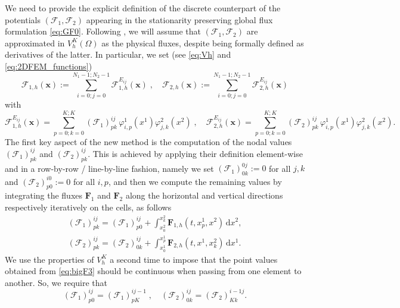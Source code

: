 \documentclass[a4paper,10pt]{article}
\begin{document}
We need to provide the explicit definition of the discrete counterpart of the potentials $(\mathcal{F}_1,\mathcal{F}_2)$ appearing in the 
stationarity preserving global flux formulation  \eqref{eq:GF0}. Following \cite{barsukow2025structure,barsukow2025stationaritypreservingnodalfinite}, 
we will assume that $(\mathcal{F}_1,\mathcal{F}_2)$ are approximated in $V_h^K(\Omega)$ as the physical fluxes, despite
being formally defined as derivatives of the latter. 
In particular, we set  (see \eqref{eq:Vh} and \eqref{eq:2DFEM_functions})
\begin{equation}\label{eq:bigF1}
\mathcal{F}_{1,h}(\mathbf{x}):= \sum_{i=0;j=0}^{N_1-1;N_2-1}\mathcal{F}_{1,h}^{E_{ij}}(\mathbf{x}) \;,\quad
\mathcal{F}_{2,h}(\mathbf{x}):=\sum_{i=0;j=0}^{N_1-1;N_2-1}\mathcal{F}_{2,h}^{E_{ij}}(\mathbf{x})
\end{equation}
with
\begin{equation}\label{eq:bigF2}
\mathcal{F}_{1,h}^{E_{ij}}(\mathbf{x}) =  \sum_{p=0;k=0}^{K;K} (\mathcal{F}_1)^{ij}_{pk}\, \varphi^1_{i,p}(x^1)\varphi^2_{j,k}(x^2)\;,\quad
\mathcal{F}_{2,h}^{E_{ij}}(\mathbf{x}) = \sum_{p=0;k=0}^{K;K}  (\mathcal{F}_2)^{ij}_{pk}\, \varphi^1_{i,p}(x^1)\varphi^2_{j,k}(x^2).
\end{equation}
The first key aspect of the new method is the computation of the nodal values $(\mathcal{F}_1)^{ij}_{pk}$ and $(\mathcal{F}_2)^{ij}_{pk}$.
This is achieved by applying their definition element-wise  and in a row-by-row / line-by-line fashion, namely we set $(\mathcal{F}_1)^{0j}_{0k} :=0$ for all $j,k$ and $(\mathcal{F}_2)^{i0}_{p0} :=0$ for all $i,p$, and then we compute the remaining values by integrating the fluxes $\mathbf{F}_1$ and $\mathbf{F}_2$ along the horizontal and vertical directions respectively iteratively on the cells, as follows
\begin{equation}\label{eq:bigF3}
\begin{split}
(\mathcal{F}_1)^{ij}_{pk} = (\mathcal{F}_1)^{ij}_{p0} + \int_{x^2_{0}}^{x^2_{k}} \mathbf{F}_{1,h}(t,x^1_{p},x^2) \,\mathrm{d}x^2,\\
(\mathcal{F}_2)^{ij}_{pk} = (\mathcal{F}_2)^{ij}_{0k} + \int_{x^1_{0}}^{x^1_{p}} \mathbf{F}_{2,h}(t,x^1,x^2_{k}) \,\mathrm{d}x^1.
\end{split}
\end{equation}
We use the properties of $ V_h^K$ a second time to impose that the point values obtained from \eqref{eq:bigF3} should be continuous when passing from one element to another.
So, we require that 
\begin{equation}\label{eq:bigF6}
(\mathcal{F}_1)^{ij}_{p0} =(\mathcal{F}_1)^{i j-1}_{pK}\;,\quad
(\mathcal{F}_2)^{ij}_{0k} =(\mathcal{F}_2)^{i-1 j}_{Kk}.
\end{equation}
\end{document}
